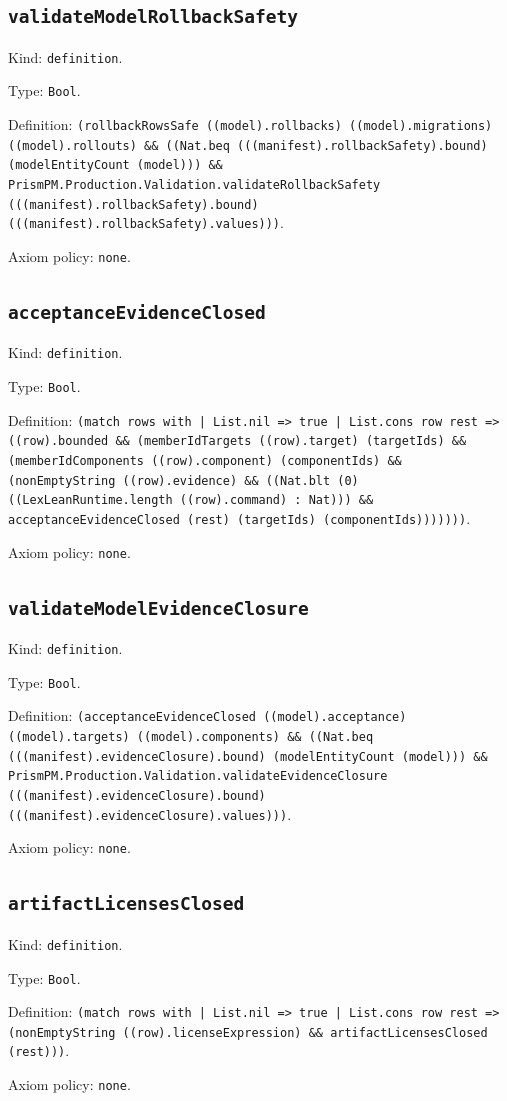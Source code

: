 \documentclass[11pt]{article}
\begin{document}
\subsection*{\texttt{validateModelRollbackSafety}}
\noindent Kind: \texttt{definition}.\par
\noindent Type: \texttt{Bool}.\par
\noindent Definition: \texttt{(rollbackRowsSafe ((model).rollbacks) ((model).migrations) ((model).rollouts) \&\& ((Nat.beq (((manifest).rollbackSafety).bound) (modelEntityCount (model))) \&\& PrismPM.Production.Validation.validateRollbackSafety (((manifest).rollbackSafety).bound) (((manifest).rollbackSafety).values)))}.\par
\noindent Axiom policy: \texttt{none}.\par
\subsection*{\texttt{acceptanceEvidenceClosed}}
\noindent Kind: \texttt{definition}.\par
\noindent Type: \texttt{Bool}.\par
\noindent Definition: \texttt{(match rows with | List.nil => true | List.cons row rest => ((row).bounded \&\& (memberIdTargets ((row).target) (targetIds) \&\& (memberIdComponents ((row).component) (componentIds) \&\& (nonEmptyString ((row).evidence) \&\& ((Nat.blt (0) ((LexLeanRuntime.length ((row).command) : Nat))) \&\& acceptanceEvidenceClosed (rest) (targetIds) (componentIds)))))))}.\par
\noindent Axiom policy: \texttt{none}.\par
\subsection*{\texttt{validateModelEvidenceClosure}}
\noindent Kind: \texttt{definition}.\par
\noindent Type: \texttt{Bool}.\par
\noindent Definition: \texttt{(acceptanceEvidenceClosed ((model).acceptance) ((model).targets) ((model).components) \&\& ((Nat.beq (((manifest).evidenceClosure).bound) (modelEntityCount (model))) \&\& PrismPM.Production.Validation.validateEvidenceClosure (((manifest).evidenceClosure).bound) (((manifest).evidenceClosure).values)))}.\par
\noindent Axiom policy: \texttt{none}.\par
\subsection*{\texttt{artifactLicensesClosed}}
\noindent Kind: \texttt{definition}.\par
\noindent Type: \texttt{Bool}.\par
\noindent Definition: \texttt{(match rows with | List.nil => true | List.cons row rest => (nonEmptyString ((row).licenseExpression) \&\& artifactLicensesClosed (rest)))}.\par
\noindent Axiom policy: \texttt{none}.\par
\end{document}
